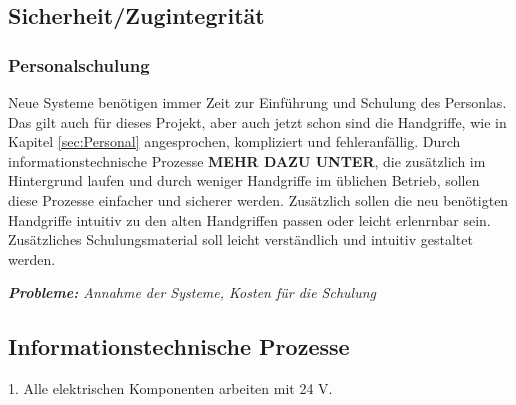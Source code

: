 \subsection{Sicherheit/Zugintegrität}
\subsubsection{Personalschulung}
Neue Systeme benötigen immer Zeit zur Einführung und Schulung des Personlas. Das gilt auch für dieses Projekt, aber auch jetzt schon sind die Handgriffe, wie in Kapitel \ref{sec:Personal} angesprochen, kompliziert und fehleranfällig. Durch informationstechnische Prozesse \textbf{MEHR DAZU UNTER}, die zusätzlich im Hintergrund laufen und durch weniger Handgriffe im üblichen Betrieb, sollen diese Prozesse einfacher und sicherer werden. Zusätzlich sollen die neu benötigten Handgriffe intuitiv zu den alten Handgriffen passen oder leicht erlenrnbar sein. Zusätzliches Schulungsmaterial soll leicht verständlich und intuitiv gestaltet werden.\par
\textit{\textbf{Probleme:} Annahme der Systeme, Kosten für die Schulung}

\subsection{Informationstechnische Prozesse}
1.	Alle elektrischen Komponenten arbeiten mit 24 V.
